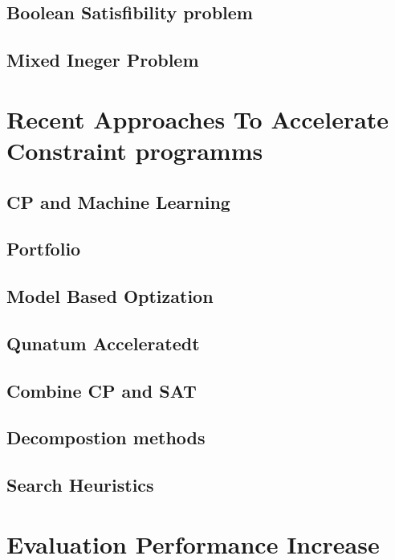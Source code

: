 \subsection{Boolean Satisfibility problem}
\label{sec: Boolean Satisfibility problem}


\subsection{Mixed Ineger Problem}
\label{sec: Mixed Ineger Problem}


\section{Recent Approaches To Accelerate Constraint programms}
\label{sec:Recent Approaches To Accelerate Constraint programms}


\subsection{CP and Machine Learning}
\label{sec:CP and Machine Learning}

  
\subsection{Portfolio}
\label{sec:Portfolio}

  
\subsection{Model Based Optization}
\label{sec:Model Based Optization}

  
\subsection{Qunatum Acceleratedt}
\label{sec:Qunatum Accelerated}

  
\subsection{Combine CP and SAT}
\label{sec:Combine CP and SAT}

  
\subsection{Decompostion methods}
\label{sec:Decompostion methods}

  
\subsection{Search Heuristics}
\label{sec:Search Heuristics}


\section{Evaluation Performance Increase}
\label{sec:Evaluation Performance Increase}





\printbibliography[heading=bibintoc]





